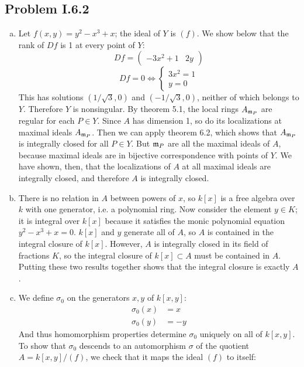 \documentclass{mathnotes}
\begin{document}
\subsection*{Problem I.6.2}
\begin{enumerate}[(a)]
\item Let $f(x,y) = y^2 - x^3 + x$; the ideal of $Y$ is $(f)$. We show below that the rank of $Df$ is 1 at every point
	of $Y$:
	\[	Df = ( \begin{array} {cc} -3x^2 + 1 & 2y \end{array} )	\]
	\[	Df = 0 \Leftrightarrow \left\{ \begin{array}{c} 3x^2 = 1 \\ y = 0 \end{array}\right.	\]
	This has solutions $(1/\sqrt{3} , 0)$ and $(-1/\sqrt{3}, 0)$, neither of which belongs to $Y$. Therefore $Y$ is
	nonsingular. By theorem 5.1, the local rings $A_{\mathfrak m_P}$ are regular for each $P \in Y$. Since $A$ has
	dimension 1, so do its localizations at maximal ideals $A_{\mathfrak m_P}$. Then we can apply theorem 6.2, which shows
	that $A_{\mathfrak m_P}$ is integrally closed for all $P\in Y$. But $\mathfrak m_P$ are all the maximal ideals of $A$, because
	maximal ideals are in bijective correspondence with points of $Y$. We have shown, then, that the localizations of $A$
	at all maximal ideals are integrally closed, and therefore $A$ is integrally closed.
\item There is no relation in $A$ between powers of $x$, so $k[x]$ is a free algebra over $k$ with one generator, i.e. a
	polynomial ring.  Now consider the element $y \in K$; it is integral over $k[x]$
	because it satisfies the monic polynomial equation $y^2 - x^3 + x = 0$. $k[x]$ and $y$ generate all of $A$, so $A$ is
	contained in the integral closure of $k[x]$. However, $A$ is integrally closed in its field of fractions $K$, so the integral
	closure of $k[x] \subset A$ must be contained in $A$. Putting these two results together shows that the integral closure
	is exactly $A$.
\item We define $\sigma_0$ on the generators $x, y$ of $k[x,y]$:
	\begin{align*}	\sigma_0 (x) &= x \\ \sigma_0(y) &=-y	\end{align*}
	And thus homomorphism properties determine $\sigma_0$ uniquely on all of $k[x,y]$. To show that $\sigma_0$ descends
	to an automorphism $\sigma$ of the quotient $A = k[x,y] / (f)$, we check that it maps the ideal $(f)$ to itself:

\end{enumerate}
\end{document}

